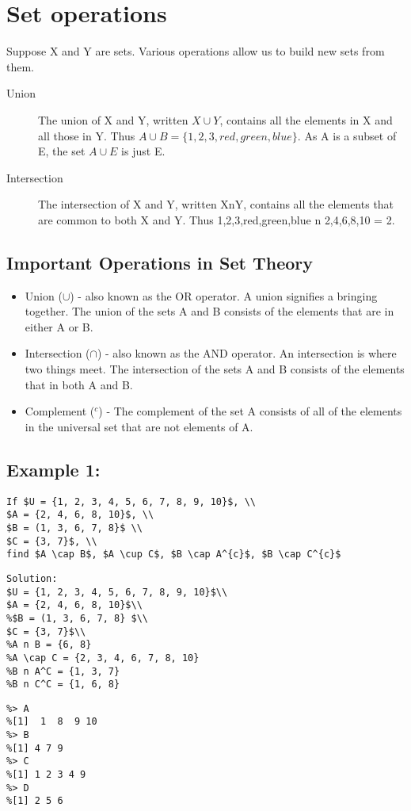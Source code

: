 \documentclass[12pt]{article}
\begin{document}
\section{Set operations}
Suppose X and Y are sets. Various operations allow us to build new sets from them.
\begin{description}
\item[Union]
The union of X and Y, written $X\cup Y$, contains all the elements in X and all those in Y. Thus $A \cup B = \{1, 2, 3, red, green, blue\}$. As A is a subset of E, the set $A \cup E$ is just E.
\item[Intersection]
The intersection of X and Y, written XnY, contains all the elements that are common to both X and Y. Thus {1,2,3,red,green,blue} n {2,4,6,8,10} = {2}.
\end{description}
\subsection{Important Operations in Set Theory}
\begin{itemize}
\item Union ($\cup$) - also known as the OR operator. A union signifies a bringing together. The union of the sets A and B consists of the elements that are in either A or B.
\item Intersection ($\cap$) - also known as the AND operator. An intersection is where two things meet. The intersection of the sets A and B consists of the elements that in both A and B.
\item Complement ($^{c}$) - The complement of the set A consists of all of the elements in the universal set that are not elements of A.
\end{itemize}
\subsection*{Example 1: }
\begin{verbatim}
If $U = {1, 2, 3, 4, 5, 6, 7, 8, 9, 10}$, \\
$A = {2, 4, 6, 8, 10}$, \\
$B = (1, 3, 6, 7, 8}$ \\
$C = {3, 7}$, \\
find $A \cap B$, $A \cup C$, $B \cap A^{c}$, $B \cap C^{c}$
\end{verbatim}
\begin{verbatim}
Solution:
$U = {1, 2, 3, 4, 5, 6, 7, 8, 9, 10}$\\
$A = {2, 4, 6, 8, 10}$\\
%$B = (1, 3, 6, 7, 8} $\\
$C = {3, 7}$\\
%A n B = {6, 8}
%A \cap C = {2, 3, 4, 6, 7, 8, 10}
%B n A^C = {1, 3, 7}
%B n C^C = {1, 6, 8}
\end{verbatim}
\begin{verbatim}
%> A
%[1]  1  8  9 10
%> B
%[1] 4 7 9
%> C
%[1] 1 2 3 4 9
%> D
%[1] 2 5 6
\end{verbatim}
\end{document}
